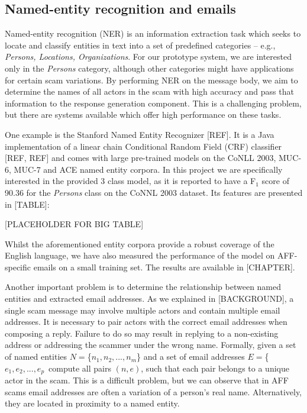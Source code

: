 \subsection{Named-entity recognition and emails}
Named-entity recognition (NER) is an information extraction task which seeks to locate and classify entities in text into a set of predefined categories -- e.g., \textit{Persons, Locations, Organizations}. For our prototype system, we are interested only in the \emph{Persons} category, although other categories might have applications for certain scam variations.  By performing NER on the message body, we aim to determine the names of all actors in the scam with high accuracy and pass that information to the response generation component. This is a challenging problem, but there are systems available which offer high performance on these tasks.

One example is the Stanford Named Entity Recognizer [REF]. It is a Java implementation of a linear chain Conditional Random Field (CRF) classifier [REF, REF] and comes with large pre-trained models on the CoNLL 2003, MUC-6, MUC-7 and ACE named entity corpora. In this project we are specifically interested in the provided 3 class model, as it is reported to have a F$_{1}$ score of 90.36 for the \emph{Persons} class on the CoNNL 2003 dataset. Its features are presented in [TABLE]:

[PLACEHOLDER FOR BIG TABLE]

Whilst the aforementioned entity corpora provide a robust coverage of the English language, we have also measured the performance of the model on AFF-specific emails on a small training set. The results are available in [CHAPTER]. 

Another important problem is to determine the relationship between named entities and extracted email addresses. As we explained in [BACKGROUND], a single scam message may involve multiple actors and contain multiple email addresses. It is necessary to pair actors with the correct email addresses when composing a reply. Failure to do so may result in replying to a non-existing address or addressing the scammer under the wrong name. Formally, given a set of named entities $N = $\{$n_{1}, n_{2},...,n_{m}$\} and a set of email addresses $E = $\{$e_{1}, e_{2},...,e_{p}$\, compute all pairs $(n, e)$, such that each pair belongs to a unique actor in the scam. This is a difficult problem, but we can observe that in AFF scams email addresses are often a variation of a person's real name. Alternatively, they are located in proximity to a named entity.

